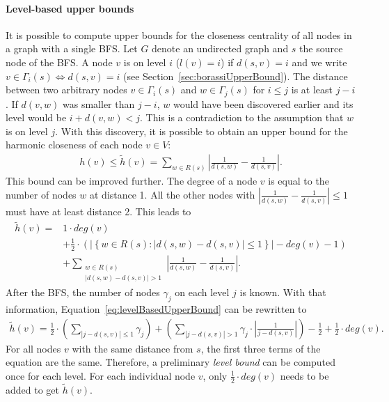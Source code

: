 \paragraph{Level-based upper bounds}
It is possible to compute upper bounds for the closeness centrality of all nodes in a graph with a single BFS. Let $G$ denote an undirected graph and $s$ the source node of the BFS. A node $v$ is on level $i$ ($l(v) = i$) if $d(s, v) = i$ and we write $v \in \Gamma_i(s) \iff d(s, v) = i$ (see Section~\ref{sec:borassiUpperBound}). The distance between two arbitrary nodes $v \in \Gamma_i(s)$ and $w \in \Gamma_j(s)$ for $i \leq j$ is at least $j - i$. If $d(v, w)$ was smaller than $j - i$, $w$ would have been discovered earlier and its level would be $i + d(v, w) < j$. This is a contradiction to the assumption that $w$ is on level $j$. With this discovery, it is possible to obtain an upper bound for the harmonic closeness of each node $v \in V$:
\begin{align*}
	h(v) \leq \widetilde{h}(v) = \sum_{w \in R(s)}{\left| \frac{1}{d(s, w)} - \frac{1}{d(s, v)} \right| }.
\end{align*}
This bound can be improved further. The degree of a node $v$ is equal to the number of nodes $w$ at distance 1. All the other nodes with $\left| \frac{1}{d(s, w)} - \frac{1}{d(s, v)}\right| \leq 1$ must have at least distance 2. This leads to
\begin{align}
	\widetilde{h}(v) ={} &1\cdot deg(v) \nonumber \\
	               &+ \frac{1}{2} \cdot \left( \left|\left\{ w \in R(s) : \left| d(s, w) - d(s, v) \right| \leq 1 \right\} \right| - deg(v) - 1 \right) \nonumber \\
	               &+ \sum_{\substack{w \in R(s) \\ |d(s, w) - d(s, v)| > 1}}{|\frac{1}{d(s, w)} - \frac{1}{d(s, v)}|}. \label{eq:levelBasedUpperBound} 
\end{align}
After the BFS, the number of nodes $\gamma_j$ on each level $j$ is known. With that information, Equation~\ref{eq:levelBasedUpperBound} can be rewritten to
\begin{align}
	\widetilde{h}(v) = \frac{1}{2} \cdot \left(\sum_{|j - d(s, v)| \leq 1}{\gamma_j}\right) + \left(\sum_{|j - d(s, v)| > 1}{\gamma_j \cdot \left|\frac{1}{j - d(s, v)}\right|}\right) - \frac{1}{2} + \frac{1}{2} \cdot deg(v).
\end{align}
For all nodes $v$ with the same distance from $s$, the first three terms of the equation are the same. Therefore, a preliminary \emph{level bound} can be computed once for each level. For each individual node $v$, only $\frac{1}{2}\cdot deg(v)$ needs to be added to get $\widetilde{h}(v)$.

